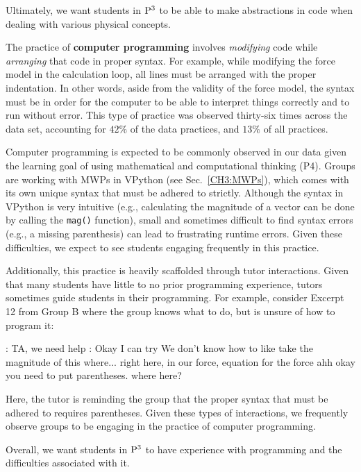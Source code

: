 \documentclass{msuphddissertation}
\begin{document}
\begin{doublespace}
Ultimately, we want students in ${\rm P}^{3}$ to be able to make abstractions in code when dealing with various physical concepts.

The practice of \textbf{computer programming} involves \textit{modifying} code while \textit{arranging} that code in proper syntax.  For example, while modifying the force model in the calculation loop, all lines must be arranged with the proper indentation.  In other words, aside from the validity of the force model, the syntax must be in order for the computer to be able to interpret things correctly and to run without error.  This type of practice was observed thirty-six times across the data set, accounting for $42\%$ of the data practices, and $13\%$ of all practices.

Computer programming is expected to be commonly observed in our data given the learning goal of using mathematical and computational thinking (P4).  Groups are working with MWPs in VPython (see Sec.~\ref{CH3:MWPs}), which comes with its own unique syntax that must be adhered to strictly.  Although the syntax in VPython is very intuitive (e.g., calculating the magnitude of a vector can be done by calling the \texttt{mag()} function), small and sometimes difficult to find syntax errors (e.g., a missing parenthesis) can lead to frustrating runtime errors.  Given these difficulties, we expect to see students engaging frequently in this practice.

Additionally, this practice is heavily scaffolded through tutor interactions.  Given that many students have little to no prior programming experience, tutors sometimes guide students in their programming.  For example, consider Excerpt 12 from Group B where the group knows what to do, but is unsure of how to program it: \begin{description}
\SB: TA, we need help
\TA: Okay I can try
\SB We don't know how to like take the magnitude of this
\TA where...
\SB right here, in our force, equation for the force
\TA ahh okay you need to put parentheses.
\SB where here?
\end{description}  Here, the tutor is reminding the group that the proper syntax that must be adhered to requires parentheses.  Given these types of interactions, we frequently observe groups to be engaging in the practice of computer programming.

Overall, we want students in ${\rm P}^{3}$ to have experience with programming and the difficulties associated with it.


\end{doublespace}
\end{document}
